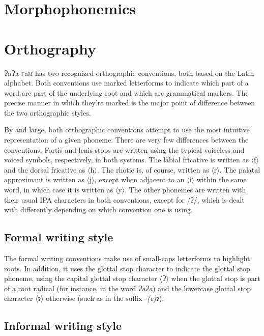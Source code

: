 \documentclass[a4paper,10pt,twoside,openright]{memoir}
\newcommand{\lang}{{\bigglot}a{\bigglot}a-\textsc{f}a\textsc{m}}
\newcommand{\sqbrack}[1]{$\langle$#1$\rangle$}
\newcommand{\phipa}[1]{/#1/}
\newcommand{\glotstop}{ʔ}
\newcommand{\bigglot}{Ɂ}
\newcommand{\lilglot}{ɂ}
\begin{document}
\section{Morphophonemics}

\section{Orthography}

\lang{} has two recognized orthographic conventions, both based on the Latin alphabet. Both conventions use marked letterforms to indicate which part of a word are part of the underlying root and which are grammatical markers. The precise manner in which they're marked is the major point of difference between the two orthographic styles.

By and large, both orthographic conventions attempt to use the most intuitive representation of a given phoneme. There are very few differences between the conventions. Fortis and lenis stops are written using the typical voiceless and voiced symbols, respectively, in both systems. The labial fricative is written as \sqbrack{f} and the dorsal fricative as \sqbrack{h}. The rhotic is, of course, written as \sqbrack{r}. The palatal approximant is written as \sqbrack{j}, except when adjacent to an \sqbrack{i} within the same word, in which case it is written as \sqbrack{y}. The other phonemes are written with their usual IPA characters in both conventions, except for \phipa{\glotstop}, which is dealt with differently depending on which convention one is using.

\subsection{Formal writing style}

The formal writing conventions make use of small-caps letterforms to highlight roots. In addition, it uses the glottal stop character to indicate the glottal stop phoneme, using the capital glottal stop character \sqbrack{\bigglot} when the glottal stop is part of a root radical (for instance, in the word \textit{\bigglot a\bigglot a}) and the lowercase glottal stop character \sqbrack{\lilglot} otherwise (such as in the suffix \textit{-(e)}\lilglot).

\subsection{Informal writing style}
\end{document}
